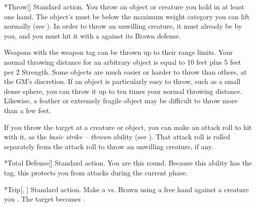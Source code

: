   \begin{activeability}*{Throw}[]
    \abilityusagetime Standard action.
    \rankline
    You throw an object or creature you hold in at least one hand.
    The object's  must be below the maximum weight category you can lift normally (see ).
    In order to throw an unwilling creature, it must already be \grappled by you, and you must hit it with a  against its Brawn defense.

    Weapons with the  weapon tag can be thrown up to their range limits.
    Your normal throwing distance for an arbitrary object is equal to 10 feet plus 5 feet per 2 Strength.
    Some objects are much easier or harder to throw than others, at the GM's discretion.
    If an object is particularly easy to throw, such as a small dense sphere, you can throw it up to ten times your normal throwing distance.
    Likewise, a feather or extremely fragile object may be difficult to throw more than a few feet.

    If you throw the target at a creature or object, you can make an attack roll to hit with it, as the \textit{basic strike -- thrown} ability (see ).
    That attack roll is rolled separately from the attack roll to throw an unwilling creature, if any.
  \end{activeability}

  \begin{activeability}*{Total Defense}[]
    \abilityusagetime Standard action.
    \rankline
    You are \braced this round.
    Because this ability has the  tag, this protects you from attacks during the current phase.
  \end{activeability}

  \begin{activeability}*{Trip}[, ]
    \abilityusagetime Standard action.
    \rankline
    Make a  vs. Brawn using a free hand against a creature you .
    \hit The target becomes \prone.
  \end{activeability}

